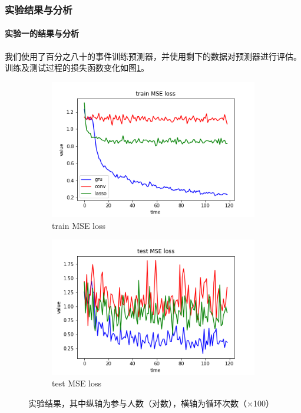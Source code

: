 \subsubsection{实验结果与分析}
\paragraph{实验一的结果与分析}
我们使用了百分之八十的事件训练预测器，并使用剩下的数据对预测器进行评估。训练及测试过程的损失函数变化如图\ref{f2-4}。
\begin{figure}[htb]
	\centering
	\begin{subfigure}{.49\textwidth}
		\includegraphics[width=\textwidth]{trainloss.png}
		\caption{train MSE loss}
	\end{subfigure}
	\begin{subfigure}{.49\textwidth}
		\includegraphics[width=\textwidth]{testloss.png}
		\caption{test MSE loss}
	\end{subfigure}
    \caption{实验结果，其中纵轴为参与人数（对数），横轴为循环次数（×100）}
    \label{f2-4}
\end{figure} 
